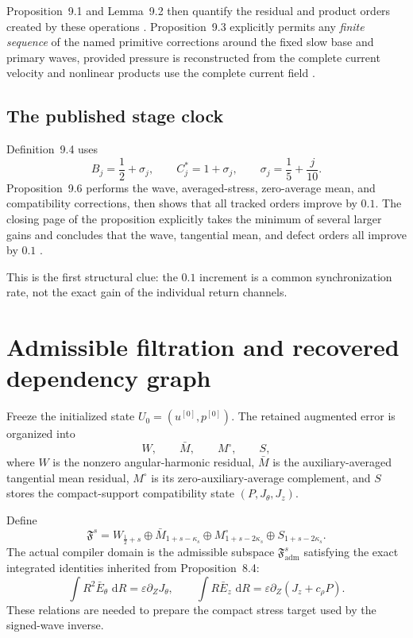 \documentclass[11pt]{article}
\numberwithin{equation}{section}
\theoremstyle{highend}
\theoremstyle{definition}
\newcommand{\F}{\mathfrak F}
\newcommand{\Fadm}{\mathfrak F_{\mathrm{adm}}}
\newcommand{\dd}{\,\mathrm d}
\begin{document}
Proposition~9.1 and Lemma~9.2 then quantify the residual and product orders created by these operations \cite[pp.~101--103]{OpenAI2026NS}. Proposition~9.3 explicitly permits any \emph{finite sequence} of the named primitive corrections around the fixed slow base and primary waves, provided pressure is reconstructed from the complete current velocity and nonlinear products use the complete current field \cite[pp.~103--105]{OpenAI2026NS}.

\subsection{The published stage clock}
Definition~9.4 uses
\[
B_j=\frac12+\sigma_j,
\qquad
C_j^*=1+\sigma_j,
\qquad
\sigma_j=\frac15+\frac{j}{10}.
\]
Proposition~9.6 performs the wave, averaged-stress, zero-average mean, and compatibility corrections, then shows that all tracked orders improve by $0.1$. The closing page of the proposition explicitly takes the minimum of several larger gains and concludes that the wave, tangential mean, and defect orders all improve by $0.1$ \cite[p.~111]{OpenAI2026NS}.

This is the first structural clue: the $0.1$ increment is a common synchronization rate, not the exact gain of the individual return channels.

\section{Admissible filtration and recovered dependency graph}
Freeze the initialized state $U_0=(u^{[0]},p^{[0]})$. The retained augmented error is organized into
\[
W,\qquad \bar M,\qquad M^\circ,\qquad S,
\]
where $W$ is the nonzero angular-harmonic residual, $\bar M$ is the auxiliary-averaged tangential mean residual, $M^\circ$ is its zero-auxiliary-average complement, and $S$ stores the compact-support compatibility state $(P,J_\theta,J_z)$.

Define
\begin{equation}\label{eq:filtration}
\F^s=
W_{\frac12+s}
\oplus
\bar M_{1+s-\kappa_s}
\oplus
M^\circ_{1+s-2\kappa_s}
\oplus
S_{1+s-2\kappa_s}.
\end{equation}
The actual compiler domain is the admissible subspace $\Fadm^s$ satisfying the exact integrated identities inherited from Proposition~8.4:
\[
\int R^2\bar E_\theta\,\dd R=\varepsilon\partial_ZJ_\theta,
\qquad
\int R\bar E_z\,\dd R=\varepsilon\partial_Z(J_z+c_\rho P).
\]
These relations are needed to prepare the compact stress target used by the signed-wave inverse.
\end{document}
